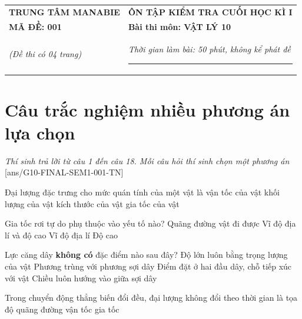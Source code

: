 \begin{center}
	\begin{tabular}{M{9.25cm}M{8.75cm}}
		\textbf{TRUNG TÂM MANABIE}& \textbf{ÔN TẬP KIỂM TRA CUỐI HỌC KÌ I}\\
		\textbf{MÃ ĐỀ: 001}& \textbf{Bài thi môn: VẬT LÝ 10}\\
		\textit{(Đề thi có 04 trang)}& \textit{Thời gian làm bài: 50 phút, không kể phát đề}
		
		\noindent\rule{4cm}{0.8pt} \\
	\end{tabular}
\end{center}
\setcounter{section}{0}
\section{Câu trắc nghiệm nhiều phương án lựa chọn}
\textit{Thí sinh trả lời từ câu 1 đến câu 18. Mỗi câu hỏi thí sinh chọn một phương án}
\setcounter{ex}{0}
[ans/G10-FINAL-SEM1-001-TN]

\begin{ex}
	Đại lượng đặc trưng cho mức quán tính của một vật là
	\choice
	{vận tốc của vật}
	{\True khối lượng của vật}
	{kích thước của vật}
	{gia tốc của vật}
	\loigiai{}
\end{ex}
\begin{ex}
	Gia tốc rơi tự do phụ thuộc vào yếu tố nào?
	\choice
	{Quãng đường vật đi được}
	{\True Vĩ độ địa lí và độ cao}
	{Vĩ độ địa lí}
	{Độ cao}
	\loigiai{}
\end{ex}
\begin{ex}
	Lực căng dây \textbf{không có} đặc điểm nào sau đây?
	\choice
	{\True Độ lớn luôn bằng trọng lượng của vật}
	{Phương trùng với phương sợi dây}
	{Điểm đặt ở hai đầu dây, chỗ tiếp xúc với vật}
	{Chiều luôn hướng vào giữa sợi dây}
	\loigiai{}
\end{ex}
\begin{ex}
	Trong chuyển động thẳng biến đổi đều, đại lượng không đổi theo thời gian là
	\choice
	{tọa độ}
	{quãng đường}
	{vận tốc}
	{\True gia tốc}
	\loigiai{}
\end{ex}

